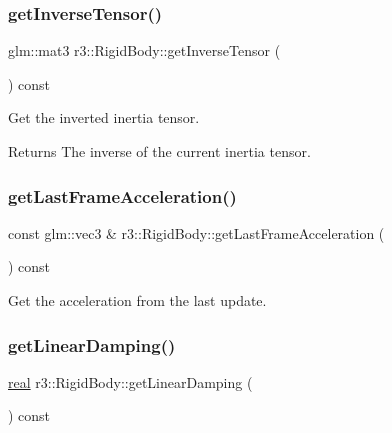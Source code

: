\subsubsection{\texorpdfstring{get\+Inverse\+Tensor()}{getInverseTensor()}}
{\footnotesize\ttfamily glm\+::mat3 r3\+::\+Rigid\+Body\+::get\+Inverse\+Tensor (\begin{DoxyParamCaption}{ }\end{DoxyParamCaption}) const}



Get the inverted inertia tensor. 

\begin{DoxyReturn}{Returns}
The inverse of the current inertia tensor. 
\end{DoxyReturn}
\mbox{\label{classr3_1_1_rigid_body_a0107527952d289050043c9625a7818ee}} 
\subsubsection{\texorpdfstring{get\+Last\+Frame\+Acceleration()}{getLastFrameAcceleration()}}
{\footnotesize\ttfamily const glm\+::vec3 \& r3\+::\+Rigid\+Body\+::get\+Last\+Frame\+Acceleration (\begin{DoxyParamCaption}{ }\end{DoxyParamCaption}) const}



Get the acceleration from the last update. 

\mbox{\label{classr3_1_1_rigid_body_ab48c055a703f1d3d84b9f1977ef504e6}} 
\subsubsection{\texorpdfstring{get\+Linear\+Damping()}{getLinearDamping()}}
{\footnotesize\ttfamily \mbox{\hyperlink{namespacer3_ab2016b3e3f743fb735afce242f0dc1eb}{real}} r3\+::\+Rigid\+Body\+::get\+Linear\+Damping (\begin{DoxyParamCaption}{ }\end{DoxyParamCaption}) const}



